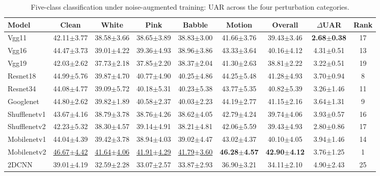 \begin{table}[H]
\centering\color{black}
\caption{Five-class classification under noise-augmented training: UAR across the four perturbation categories.}\label{tab:supp_all_models_multiclass}
\begingroup
\fontsize{8.0}{9.2}\selectfont
\setlength{\tabcolsep}{1.4pt}\renewcommand{\arraystretch}{1.0}
\begin{tabular*}{\linewidth}{@{\extracolsep{\fill}}lcccccccc@{}}\toprule
\textbf{Model} & \textbf{Clean} & \textbf{White} & \textbf{Pink} & \textbf{Babble} & \textbf{Motion} & \textbf{Overall} & \textbf{$\Delta$UAR} & \textbf{Rank}\\\midrule
Vgg11 & 42.11$\pm$3.77 & 38.58$\pm$3.66 & 38.65$\pm$3.89 & 38.83$\pm$3.00 & 41.66$\pm$3.76 & 39.43$\pm$3.46 & \textbf{2.68$\pm$0.38} & 17\\
Vgg16 & 44.47$\pm$3.73 & 39.01$\pm$4.22 & 39.36$\pm$4.93 & 38.96$\pm$3.86 & 43.33$\pm$3.64 & 40.16$\pm$4.12 & 4.31$\pm$0.51 & 13\\
Vgg19 & 42.03$\pm$2.62 & 37.73$\pm$2.18 & 37.85$\pm$2.20 & 38.37$\pm$2.04 & 41.30$\pm$2.63 & 38.81$\pm$2.22 & 3.22$\pm$0.51 & 19\\
Resnet18 & 44.99$\pm$5.76 & 39.87$\pm$4.70 & 40.77$\pm$4.90 & 40.25$\pm$4.86 & 44.25$\pm$5.48 & 41.28$\pm$4.93 & 3.70$\pm$0.94 & 8\\
Resnet34 & 44.08$\pm$4.77 & 39.09$\pm$5.72 & 40.18$\pm$5.31 & 40.23$\pm$5.38 & 43.77$\pm$5.35 & 40.82$\pm$5.39 & 3.26$\pm$1.46 & 11\\
Googlenet & 44.80$\pm$2.62 & 39.82$\pm$1.89 & 40.58$\pm$2.37 & 40.03$\pm$2.23 & 44.19$\pm$2.77 & 41.15$\pm$2.16 & 3.64$\pm$1.31 & 9\\
\midrule
Shufflenetv1 & 43.67$\pm$4.16 & 38.79$\pm$3.78 & 38.76$\pm$4.26 & 38.62$\pm$4.05 & 42.79$\pm$4.24 & 39.74$\pm$4.06 & 3.93$\pm$0.57 & 16\\
Shufflenetv2 & 42.23$\pm$5.32 & 38.30$\pm$4.57 & 39.14$\pm$4.91 & 38.21$\pm$4.81 & 42.06$\pm$5.59 & 39.43$\pm$4.93 & 2.80$\pm$0.86 & 17\\
Mobilenetv1 & 44.04$\pm$4.39 & 39.42$\pm$3.78 & 38.94$\pm$4.03 & 39.02$\pm$4.47 & 43.02$\pm$4.37 & 40.10$\pm$4.05 & 3.94$\pm$1.46 & 14\\
Mobilenetv2 & \underline{46.67$\pm$4.42} & \underline{41.64$\pm$4.06} & \underline{41.91$\pm$4.29} & \underline{41.79$\pm$3.60} & \textbf{46.28$\pm$4.57} & \textbf{42.90$\pm$4.12} & 3.76$\pm$1.25 & 1\\
\midrule
2DCNN~\cite{2DCNN} & 39.01$\pm$4.19 & 32.59$\pm$2.28 & 33.07$\pm$2.57 & 33.87$\pm$2.93 & 36.90$\pm$3.21 & 34.11$\pm$2.10 & 4.90$\pm$2.43 & 25\\

\end{tabular*}
\end{table}
